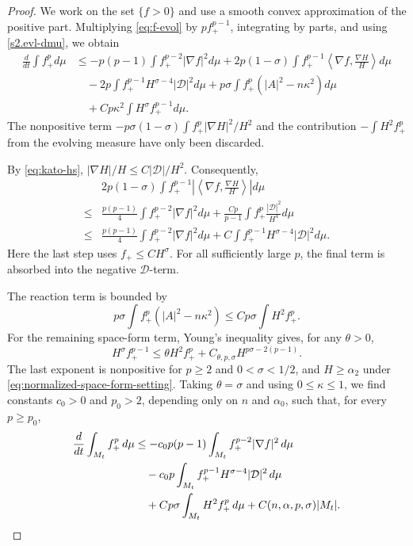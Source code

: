 \documentclass[10pt,a4paper]{amsart}
\begin{document}
\begin{proof}
We work on the set $\{f>0\}$ and use a smooth convex approximation of the
positive part.  Multiplying \eqref{eq:f-evol} by $pf_+^{p-1}$, integrating by
parts, and using \eqref{s2.evl-dmu}, we obtain
\begin{align*}
 \frac{d}{dt}\int f_+^p d\mu
 &\leq-p(p-1)\int f_+^{p-2}|\nabla f|^2d\mu
 +2p(1-\sigma)\int f_+^{p-1}
     \left\langle\nabla f,\frac{\nabla H}{H}\right\rangle d\mu\\
 &\quad-2p\int f_+^{p-1}H^{\sigma-4}|\mathcal D|^2d\mu
 +p\sigma\int f_+^p(|A|^2-n\kappa^2)d\mu\\
 &\quad+Cp\kappa^2\int H^\sigma f_+^{p-1}d\mu.
\end{align*}
The nonpositive term
$-p\sigma(1-\sigma)\int f_+^p|\nabla H|^2/H^2$ and the contribution
$-\int H^2f_+^p$ from the evolving measure have only been discarded.

By \eqref{eq:kato-hs},
$|\nabla H|/H\leq C|\mathcal D|/H^2$.  Consequently,
\begin{align*}
 &2p(1-\sigma)\int f_+^{p-1}
   \left|\left\langle\nabla f,\frac{\nabla H}{H}\right\rangle\right|d\mu\\
 \leq&\frac{p(p-1)}4\int f_+^{p-2}|\nabla f|^2d\mu
 +\frac{Cp}{p-1}\int f_+^p\frac{|\mathcal D|^2}{H^4}d\mu\\
 \leq&\frac{p(p-1)}4\int f_+^{p-2}|\nabla f|^2d\mu
 +C\int f_+^{p-1}H^{\sigma-4}|\mathcal D|^2d\mu.
\end{align*}
Here the last step uses $f_+\leq CH^\sigma$.  For all sufficiently large
$p$, the final term is absorbed into the negative $\mathcal D$-term.

The reaction term is bounded by
\begin{equation*}
 p\sigma\int f_+^p(|A|^2-n\kappa^2)
 \leq Cp\sigma\int H^2f_+^p.
\end{equation*}
For the remaining space-form term, Young's inequality gives, for any
$\theta>0$,
\begin{equation*}
 H^\sigma f_+^{p-1}
 \leq\theta H^2f_+^p
 +C_{\theta,p,\sigma}H^{p\sigma-2(p-1)}.
\end{equation*}
The last exponent is nonpositive for $p\geq2$ and
$0<\sigma<1/2$, and $H\geq\alpha_2$ under
\eqref{eq:normalized-space-form-setting}.  Taking $\theta=\sigma$ and using
$0\leq\kappa\leq1$, we find constants $c_0>0$ and $p_0>2$, depending only
on $n$ and $\alpha_0$, such that, for every $p\geq p_0$,
\begin{align}
 \frac{d}{dt}\int_{M_t}f_+^p\,d\mu
 &\leq-c_0p(p-1)\int_{M_t}f_+^{p-2}|\nabla f|^2\,d\mu\notag\\
 &\quad-c_0p\int_{M_t}f_+^{p-1}H^{\sigma-4}
                  |\mathcal D|^2\,d\mu\notag\\
 &\quad+Cp\sigma\int_{M_t}H^2f_+^p\,d\mu
       +C(n,\alpha,p,\sigma)|M_t|.
 \label{eq:first-lp}
\end{align}


\end{proof}
\end{document}
